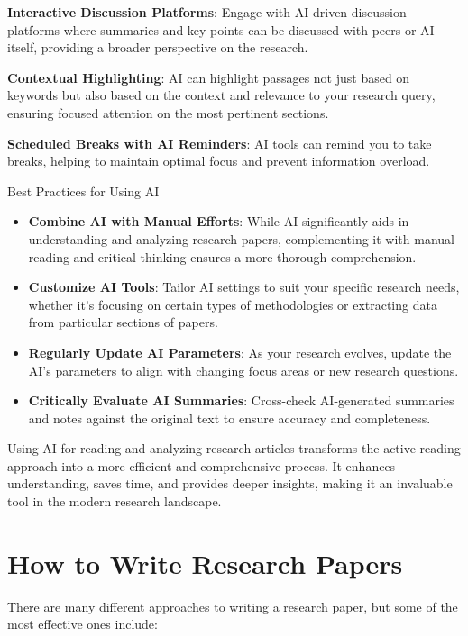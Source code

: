 \documentclass[
]{book}
\begin{document}
\textbf{Interactive Discussion Platforms}: Engage with AI-driven discussion platforms where summaries and key points can be discussed with peers or AI itself, providing a broader perspective on the research.

\textbf{Contextual Highlighting}: AI can highlight passages not just based on keywords but also based on the context and relevance to your research query, ensuring focused attention on the most pertinent sections.

\textbf{Scheduled Breaks with AI Reminders}: AI tools can remind you to take breaks, helping to maintain optimal focus and prevent information overload.

Best Practices for Using AI

\begin{itemize}
\item
  \textbf{Combine AI with Manual Efforts}: While AI significantly aids in understanding and analyzing research papers, complementing it with manual reading and critical thinking ensures a more thorough comprehension.
\item
  \textbf{Customize AI Tools}: Tailor AI settings to suit your specific research needs, whether it's focusing on certain types of methodologies or extracting data from particular sections of papers.
\item
  \textbf{Regularly Update AI Parameters}: As your research evolves, update the AI's parameters to align with changing focus areas or new research questions.
\item
  \textbf{Critically Evaluate AI Summaries}: Cross-check AI-generated summaries and notes against the original text to ensure accuracy and completeness.
\end{itemize}

Using AI for reading and analyzing research articles transforms the active reading approach into a more efficient and comprehensive process. It enhances understanding, saves time, and provides deeper insights, making it an invaluable tool in the modern research landscape.

\hypertarget{how-to-write-research-papers}{%
\section*{How to Write Research Papers}\label{how-to-write-research-papers}}

There are many different approaches to writing a research paper, but some of the most effective ones include:
\end{document}
